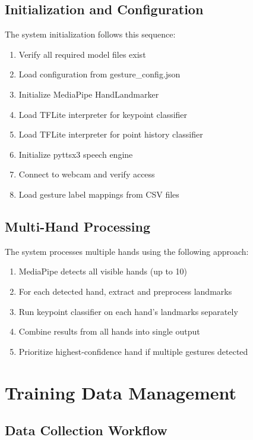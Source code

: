 \subsection{Initialization and Configuration}

The system initialization follows this sequence:
\begin{enumerate}
    \item Verify all required model files exist
    \item Load configuration from gesture\_config.json
    \item Initialize MediaPipe HandLandmarker
    \item Load TFLite interpreter for keypoint classifier
    \item Load TFLite interpreter for point history classifier
    \item Initialize pyttsx3 speech engine
    \item Connect to webcam and verify access
    \item Load gesture label mappings from CSV files
\end{enumerate}

\subsection{Multi-Hand Processing}

The system processes multiple hands using the following approach:
\begin{enumerate}
    \item MediaPipe detects all visible hands (up to 10)
    \item For each detected hand, extract and preprocess landmarks
    \item Run keypoint classifier on each hand's landmarks separately
    \item Combine results from all hands into single output
    \item Prioritize highest-confidence hand if multiple gestures detected
\end{enumerate}

\section{Training Data Management}

\subsection{Data Collection Workflow}

